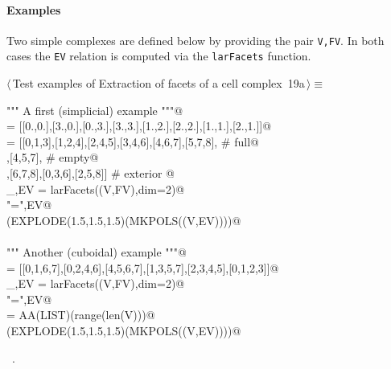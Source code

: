 \documentclass[11pt,oneside]{article}    %
\begin{document}
\paragraph{Examples}
Two simple complexes are defined below by providing the pair \texttt{V,FV}.
In both cases the \texttt{EV} relation is computed via the \texttt{larFacets} function.
\begin{flushleft} \small \label{scrap30}
\protect{}$\langle\,$Test examples of Extraction of facets of a cell complex\nobreak\ {\footnotesize 19a}$\,\rangle\equiv$
\vspace{-1ex}
\begin{list}{}{} \item
\mbox{}\verb@""" A first (simplicial) example """@\\
\mbox{}\verb@V = [[0.,0.],[3.,0.],[0.,3.],[3.,3.],[1.,2.],[2.,2.],[1.,1.],[2.,1.]]@\\
\mbox{}\verb@FV = [[0,1,3],[1,2,4],[2,4,5],[3,4,6],[4,6,7],[5,7,8], # full@\\
\mbox{}\verb@    [1,3,4],[4,5,7], # empty@\\
\mbox{}\verb@    [0,1,2],[6,7,8],[0,3,6],[2,5,8]] # exterior        @\\
\mbox{}\verb@_,EV = larFacets((V,FV),dim=2)@\\
\mbox{}\verb@print "\nEV =",EV@\\
\mbox{}\verb@VIEW(EXPLODE(1.5,1.5,1.5)(MKPOLS((V,EV))))@\\
\mbox{}\verb@@\\
\mbox{}\verb@""" Another (cuboidal) example """@\\
\mbox{}\verb@FV = [[0,1,6,7],[0,2,4,6],[4,5,6,7],[1,3,5,7],[2,3,4,5],[0,1,2,3]]@\\
\mbox{}\verb@_,EV = larFacets((V,FV),dim=2)@\\
\mbox{}\verb@print "\nEV =",EV@\\
\mbox{}\verb@VV = AA(LIST)(range(len(V)))@\\
\mbox{}\verb@VIEW(EXPLODE(1.5,1.5,1.5)(MKPOLS((V,EV))))@\\
\mbox{}\verb@@{\NWsep}
\end{list}
\vspace{-1ex}
\footnotesize\addtolength{\baselineskip}{-1ex}
\begin{list}{}{\setlength{\itemsep}{-\parsep}\setlength{\itemindent}{-\leftmargin}}
\item \NWtxtMacroRefIn\ .
\end{list}
\end{flushleft}
\end{document}
